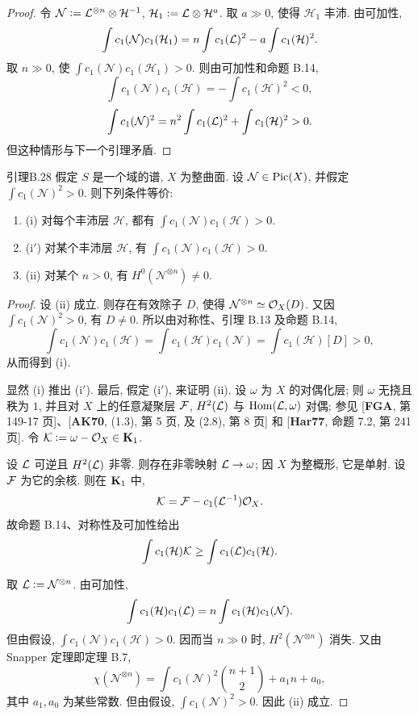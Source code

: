 \begin{proof}
令 $\mathcal N\mathrel{\mathop:}=\mathcal L^{\otimes n}\otimes\mathcal H^{-1}$, $\mathcal H_1\mathrel{\mathop:}=\mathcal L\otimes\mathcal H^a$. 取 $a\gg0$, 使得 $\mathcal H_1$ 丰沛. 由可加性,
\[\int c_1(\mathcal N)c_1(\mathcal H_1)=n\int c_1(\mathcal L)^2-a\int c_1(\mathcal H)^2.\]
取 $n\gg0$, 使 $\int c_1(\mathcal N)c_1(\mathcal H_1)>0$. 则由可加性和命题 B.14,
\[\int c_1(\mathcal N)c_1(\mathcal H)=-\int c_1(\mathcal H)^2<0,\]
\[\int c_1(\mathcal N)^2=n^2\int c_1(\mathcal L)^2+\int c_1(\mathcal H)^2>0.\]
但这种情形与下一个引理矛盾.
\end{proof}

\begin{origstatement}{引理}{B.28}\label{appB:28}
假定 $S$ 是一个域的谱, $X$ 为整曲面. 设 $\mathcal N\in\operatorname{Pic}(X)$, 并假定 $\int c_1(\mathcal N)^2>0$. 则下列条件等价:
\begin{enumerate}[label={}]
\item (i) 对每个丰沛层 $\mathcal H$, 都有 $\int c_1(\mathcal N)c_1(\mathcal H)>0$.
\item (i$'$) 对某个丰沛层 $\mathcal H$, 有 $\int c_1(\mathcal N)c_1(\mathcal H)>0$.
\item (ii) 对某个 $n>0$, 有 $H^0(\mathcal N^{\otimes n})\ne0$.
\end{enumerate}
\end{origstatement}
\begin{proof}
设 (ii) 成立. 则存在有效除子 $D$, 使得 $\mathcal N^{\otimes n}\simeq\mathcal O_X(D)$. 又因 $\int c_1(\mathcal N)^2>0$, 有 $D\ne0$. 所以由对称性、引理 B.13 及命题 B.14,
\[\int c_1(\mathcal N)c_1(\mathcal H)=\int c_1(\mathcal H)c_1(\mathcal N)=\int c_1(\mathcal H)[D]>0,\]
从而得到 (i).

显然 (i) 推出 (i$'$). 最后, 假定 (i$'$), 来证明 (ii). 设 $\omega$ 为 $X$ 的对偶化层; 则 $\omega$ 无挠且秩为 $1$, 并且对 $X$ 上的任意凝聚层 $\mathcal F$, $H^2(\mathcal L)$ 与 $\operatorname{Hom}(\mathcal L,\omega)$ 对偶; 参见 [\textbf{FGA}, 第 149-17 页]、[\textbf{AK70}, (1.3), 第 5 页, 及 (2.8), 第 8 页] 和 [\textbf{Har77}, 命题 7.2, 第 241 页]. 令 $\mathcal K\mathrel{\mathop:}=\omega-\mathcal O_X\in\mathbf K_1$.

设 $\mathcal L$ 可逆且 $H^2(\mathcal L)$ 非零. 则存在非零映射 $\mathcal L\to\omega$; 因 $X$ 为整概形, 它是单射. 设 $\mathcal F$ 为它的余核. 则在 $\mathbf K_1$ 中,
\[\mathcal K=\mathcal F-c_1(\mathcal L^{-1})\mathcal O_X.\]
故命题 B.14、对称性及可加性给出
\[\int c_1(\mathcal H)\mathcal K\ge\int c_1(\mathcal L)c_1(\mathcal H).\]

取 $\mathcal L\mathrel{\mathop:}=\mathcal N^{\otimes n}$. 由可加性,
\[\int c_1(\mathcal H)c_1(\mathcal L)=n\int c_1(\mathcal H)c_1(\mathcal N).\]
但由假设, $\int c_1(\mathcal N)c_1(\mathcal H)>0$. 因而当 $n\gg0$ 时, $H^2(\mathcal N^{\otimes n})$ 消失. 又由 Snapper 定理即定理 B.7,
\[\chi(\mathcal N^{\otimes n})=\int c_1(\mathcal N)^2\binom{n+1}{2}+a_1n+a_0,\]
其中 $a_1,a_0$ 为某些常数. 但由假设, $\int c_1(\mathcal N)^2>0$. 因此 (ii) 成立.
\end{proof}


